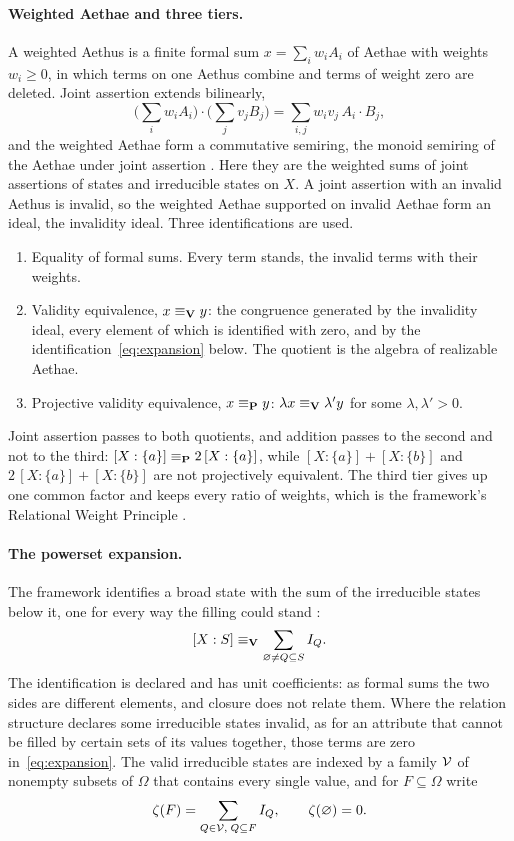 \paragraph{Weighted Aethae and three tiers.} A weighted Aethus is a finite formal sum $x = \sum_i w_i A_i$ of Aethae with weights $w_i \geq 0$, in which terms on one Aethus combine and terms of weight zero are deleted. Joint assertion extends bilinearly,
\[
\Big(\sum_i w_i A_i\Big)\cdot\Big(\sum_j v_j B_j\Big) = \sum_{i,j} w_i v_j \, A_i \cdot B_j ,
\]
and the weighted Aethae form a commutative semiring, the monoid semiring of the Aethae under joint assertion \cite{AethusTree}. Here they are the weighted sums of joint assertions of states and irreducible states on $X$. A joint assertion with an invalid Aethus is invalid, so the weighted Aethae supported on invalid Aethae form an ideal, the invalidity ideal. Three identifications are used.
\begin{enumerate}
\item[(T1)] Equality of formal sums. Every term stands, the invalid terms with their weights.
\item[(T2)] Validity equivalence, $x \equiv_{\mathbf{V}} y$: the congruence generated by the invalidity ideal, every element of which is identified with zero, and by the identification~\eqref{eq:expansion} below. The quotient is the algebra of realizable Aethae.
\item[(T3)] Projective validity equivalence, $x \equiv_{\mathbf{P}} y$: $\lambda x \equiv_{\mathbf{V}} \lambda' y$ for some $\lambda, \lambda' > 0$.
\end{enumerate}
Joint assertion passes to both quotients, and addition passes to the second and not to the third: $[X:\{a\}] \equiv_{\mathbf{P}} 2\,[X:\{a\}]$, while $[X:\{a\}] + [X:\{b\}]$ and $2\,[X:\{a\}] + [X:\{b\}]$ are not projectively equivalent. The third tier gives up one common factor and keeps every ratio of weights, which is the framework's Relational Weight Principle \cite{Aethus}.

\paragraph{The powerset expansion.} The framework identifies a broad state with the sum of the irreducible states below it, one for every way the filling could stand \cite{Aethus}:
\begin{equation}\label{eq:expansion}
[X:S] \equiv_{\mathbf{V}} \sum_{\varnothing \neq Q \subseteq S} I_Q .
\end{equation}
The identification is declared and has unit coefficients: as formal sums the two sides are different elements, and closure does not relate them. Where the relation structure declares some irreducible states invalid, as for an attribute that cannot be filled by certain sets of its values together, those terms are zero in~\eqref{eq:expansion}. The valid irreducible states are indexed by a family $\mathcal{V}$ of nonempty subsets of $\Omega$ that contains every single value, and for $F \subseteq \Omega$ write
\[
\zeta(F) = \sum_{Q \in \mathcal{V},\; Q \subseteq F} I_Q , \qquad \zeta(\varnothing) = 0 .
\]

